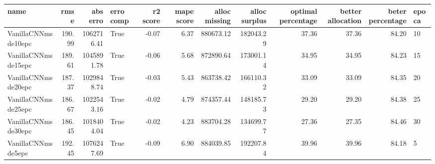 \begin{tabular}{lrrlrrrrrrrl}
\toprule
name & rmse & abs erro & erro comp & r2 score & mape score & alloc missing & alloc surplus & optimal percentage & better allocation & beter percentage & epoca \\
\midrule
VanillaCNNmsde10epc & 190.99 & 1062716.41 & True & -0.07 & 6.37 & 880673.12 & 182043.29 & 37.36 & 37.36 & 84.20 & 10 \\
VanillaCNNmsde15epc & 189.61 & 1045891.78 & True & -0.06 & 5.68 & 872890.64 & 173001.14 & 34.95 & 34.95 & 84.23 & 15 \\
VanillaCNNmsde20epc & 187.37 & 1029848.74 & True & -0.03 & 5.43 & 863738.42 & 166110.32 & 33.09 & 33.09 & 84.35 & 20 \\
VanillaCNNmsde25epc & 186.67 & 1022543.16 & True & -0.02 & 4.79 & 874357.44 & 148185.73 & 29.20 & 29.20 & 84.38 & 25 \\
VanillaCNNmsde30epc & 186.45 & 1018404.04 & True & -0.02 & 4.23 & 883704.28 & 134699.77 & 27.36 & 27.35 & 84.46 & 30 \\
VanillaCNNmsde5epc & 192.45 & 1076247.69 & True & -0.09 & 6.90 & 884039.85 & 192207.84 & 39.96 & 39.96 & 84.18 & 5 \\
\bottomrule
\end{tabular}
